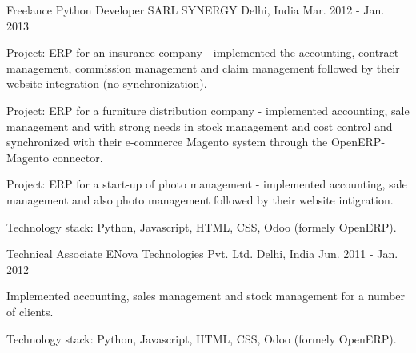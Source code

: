 \begin{cventries}
  \cventry
    {Freelance Python Developer} %
    {SARL SYNERGY} %
    {Delhi, India} %
    {Mar. 2012 - Jan. 2013} %
    {
      \begin{cvitems} %
        \item {Project: ERP for an insurance company - implemented the accounting, contract management, commission management and claim management followed by their website integration (no synchronization).}
        \item {Project: ERP for a furniture distribution company - implemented accounting, sale management and with strong needs in stock management and cost control and synchronized with their e-commerce Magento system through the OpenERP-Magento connector.}
        \item {Project: ERP for a start-up of photo management - implemented accounting, sale management and also photo management followed by their website intigration.}
        \item {Technology stack: Python, Javascript, HTML, CSS, Odoo (formely OpenERP).}
      \end{cvitems}
    }

  \cventry
    {Technical Associate} %
    {ENova Technologies Pvt. Ltd.} %
    {Delhi, India} %
    {Jun. 2011 - Jan. 2012} %
    {
      \begin{cvitems} %
        \item {Implemented accounting, sales management and stock management for a number of clients.}
        \item {Technology stack: Python, Javascript, HTML, CSS, Odoo (formely OpenERP).}
      \end{cvitems}
    }

\end{cventries}

